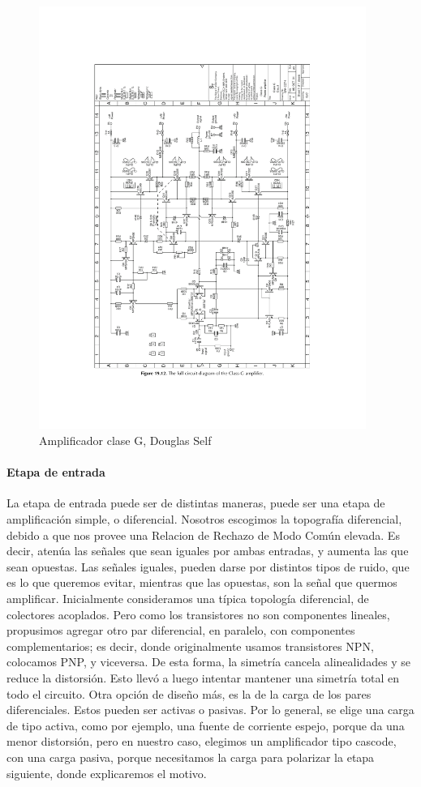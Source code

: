 \documentclass[a4paper,12pt,twoside]{article}
\begin{document}
\begin{figure}[H]
	\centering
	\includegraphics[width=0.95\textwidth]{img/clase_g_del_libro.pdf}
	\caption{Amplificador clase G, Douglas Self}
	\label{fig:ampli_DS}
\end{figure}

\paragraph{Etapa de entrada}
La etapa de entrada puede ser de distintas maneras, puede ser una etapa de amplificación simple, o diferencial. Nosotros escogimos la topografía diferencial, debido a que nos provee una Relacion de Rechazo de Modo Común elevada. Es decir, atenúa las señales que sean iguales  por ambas entradas, y aumenta las que sean opuestas. Las señales iguales, pueden darse por distintos tipos de ruido, que es lo que queremos evitar, mientras que las opuestas, son la señal que quermos amplificar. Inicialmente consideramos una típica topología diferencial, de colectores acoplados. Pero como los transistores no son componentes lineales, propusimos agregar otro par diferencial, en paralelo, con componentes complementarios; es decir, donde originalmente usamos transistores NPN, colocamos PNP, y viceversa. De esta forma, la simetría cancela alinealidades y se reduce la distorsión. Esto llevó a luego intentar mantener una simetría total en todo el circuito. Otra opción de diseño más, es la de la carga de los pares diferenciales. Estos pueden ser activas o pasivas. Por lo general, se elige una carga de tipo activa, como por ejemplo, una fuente de corriente espejo, porque da una menor distorsión, pero en nuestro caso, elegimos un amplificador tipo cascode, con una carga pasiva, porque necesitamos la carga para polarizar la etapa siguiente, donde explicaremos el motivo.
\end{document}
